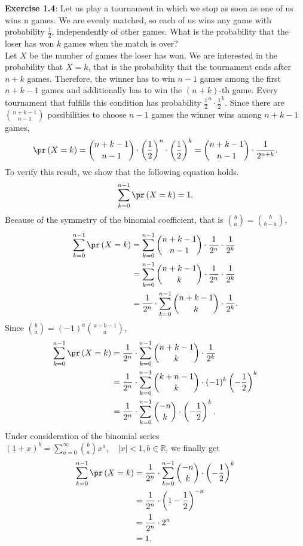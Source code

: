 \textbf{Exercise 1.4}: Let us play a tournament in which we stop as soon as one
of us wins n games. We are evenly matched, so each of us wins any game with 
probability $\frac{1}{2}$, independently of other games. What is the probability 
that the loser has won $k$ games when the match is over? \\[0.2cm]
Let $X$ be the number of games the loser has won. We are interested in the 
probability that $X = k$, that is the probability that the tournament ends 
after $n + k$ games. Therefore, the winner has to win $n-1$ games among the first 
$n + k - 1$ games and additionally has to win the $(n+k)$-th game. Every tournament 
that fulfills this condition has probability $\frac{1}{2}^n \cdot \frac{1}{2}^{k}$. 
Since there are $\binom{n+k-1}{n-1}$ possibilities to choose $n-1$ games the winner 
wins among $n+k-1$ games,
\[
  \pr\left(X = k\right)
    = \binom{n+k-1}{n-1} \cdot \left(\frac{1}{2}\right)^n \cdot \left(\frac{1}{2}\right)^{k}
    = \binom{n+k-1}{n-1} \cdot \frac{1}{2^{n+k}}.
\]
To verify this result, we show that the following equation holds.
\[
  \sum_{k=0}^{n-1}\pr\left(X=k\right) = 1.
\]
Because of the symmetry of the binomial coefficient, that is $\binom{b}{a} = \binom{b}{b - a}$,
\begin{align*}
  \sum_{k=0}^{n-1}\pr\left(X=k\right)
    &= \sum_{k=0}^{n-1} \binom{n+k-1}{n-1} \cdot \frac{1}{2^n} \cdot \frac{1}{2^k} \\
    &= \sum_{k=0}^{n-1} \binom{n+k-1}{k} \cdot \frac{1}{2^n} \cdot \frac{1}{2^k} \\
    &= \frac{1}{2^n} \cdot \sum_{k=0}^{n-1} \binom{n+k-1}{k} \cdot \frac{1}{2^k}.
\end{align*}
Since $\binom{b}{a} = (-1)^a \binom{a - b - 1}{a}$,
\begin{align*}
  \sum_{k=0}^{n-1}\pr\left(X=k\right)
    &= \frac{1}{2^n} \cdot \sum_{k=0}^{n-1} \binom{n+k-1}{k} \cdot \frac{1}{2^k} \\
    &= \frac{1}{2^n} \cdot \sum_{k=0}^{n-1} \binom{k+n-1}{k} \cdot (-1)^k \left(- \frac{1}{2}\right)^{k} \\
    &= \frac{1}{2^n} \cdot \sum_{k=0}^{n-1} \binom{-n}{k} \cdot \left(- \frac{1}{2}\right)^{k}.
\end{align*}
Under consideration of the binomial series $(1 + x)^b = \sum_{a=0}^{\infty} \binom{b}{a}x^a, 
\quad |x| < 1, b \in \mathbb{R}$, we finally get
\begin{align*}
  \sum_{k=0}^{n-1}\pr\left(X=k\right)
    &= \frac{1}{2^n} \cdot \sum_{k=0}^{n-1} \binom{-n}{k} \cdot \left(- \frac{1}{2}\right)^{k} \\
    &= \frac{1}{2^n} \cdot \left(1 - \frac{1}{2}\right)^{-n} \\
    &= \frac{1}{2^n} \cdot 2^n \\
    &= 1.
\end{align*}
